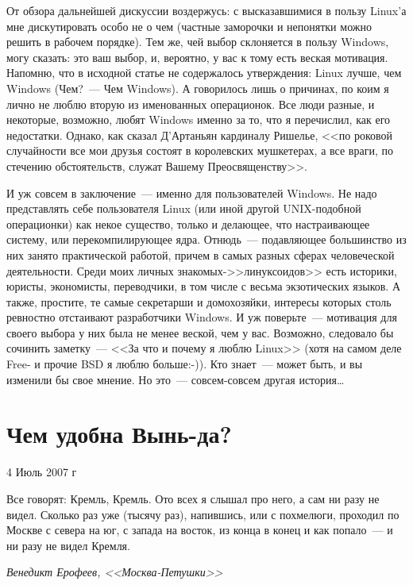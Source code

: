 От обзора дальнейшей дискуссии воздержусь: с высказавшимися в пользу Linux'а мне дискутировать особо не о чем (частные заморочки и непонятки можно решить в рабочем порядке). Тем же, чей выбор склоняется в пользу Windows, могу сказать: это ваш выбор, и, вероятно, у вас к тому есть веская мотивация. Напомню, что в исходной статье не содержалось утверждения: Linux лучше, чем Windows (Чем?~--- Чем Windows). А говорилось лишь о причинах, по коим я лично не люблю вторую из именованных операционок. Все люди разные, и некоторые, возможно, любят Windows именно за то, что я перечислил, как его недостатки. Однако, как сказал Д'Артаньян кардиналу Ришелье, <<по роковой случайности все мои друзья состоят в королевских мушкетерах, а все враги, по стечению обстоятельств, служат Вашему Преосвященству>>.

И уж совсем в заключение~--- именно для пользователей Windows. Не надо представлять себе пользователя Linux (или иной другой UNIX-подобной операционки) как некое существо, только и делающее, что настраивающее систему, или перекомпилирующее ядра. Отнюдь~--- подавляющее большинство из них занято практической работой, причем в самых разных сферах человеческой деятельности. Среди моих личных знакомых->>линуксоидов>> есть историки, юристы, экономисты, переводчики, в том числе с весьма экзотических языков. А также, простите, те самые секретарши и домохозяйки, интересы которых столь ревностно отстаивают разработчики Windows. И уж поверьте~--- мотивация для своего выбора у них была не менее веской, чем у вас. Возможно, следовало бы сочинить заметку~--- <<За что и почему я люблю Linux>> (хотя на самом деле Free- и прочие BSD я люблю больше:-)). Кто знает~--- может быть, и вы изменили бы свое мнение. Но это~--- совсем-совсем другая история\dots

\section{Чем удобна Вынь-да?} 
\begin{timeline}4 Июль 2007 г\end{timeline}

\hfill \begin{minipage}[h]{0.45\textwidth}
Все говорят: Кремль, Кремль. Ото всех я слышал про него, а сам ни разу не видел. Сколько раз уже (тысячу раз), напившись, или с похмелюги, проходил по Москве с севера на юг, с запада на восток, из конца в конец и как попало~--- и ни разу не видел Кремля.
\begin{flushright}
\textit{Венедикт Ерофеев, <<Москва-Петушки>>}
\end{flushright}
\bigskip\end{minipage}

